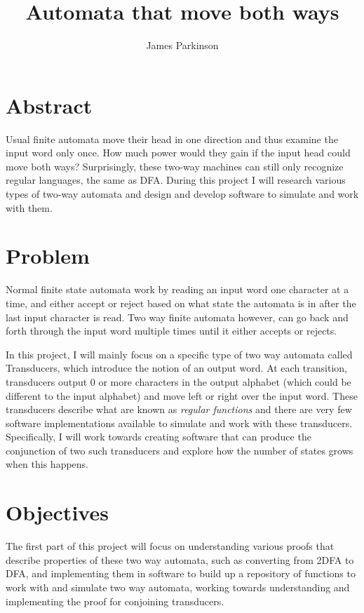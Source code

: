 \documentclass[12pt, a4paper]{article}
\title{Automata that move both ways}
\author{James Parkinson}
\begin{document}
\maketitle

\section{Abstract}

Usual finite automata move their head in one direction and thus examine the input word only once. How much power would they gain if the input head could move both ways? Surprisingly, these two-way machines can still only recognize regular languages, the same as DFA. During this project I will research various types of two-way automata and design and develop software to simulate and work with them.

\section{Problem}

Normal finite state automata work by reading an input word one character at a time, and either accept or reject based on what state the automata is in after the last input character is read. Two way finite automata however, can go back and forth through the input word multiple times until it either accepts or rejects. 

In this project, I will mainly focus on a specific type of two way automata called Transducers, which introduce the notion of an output word. At each transition, transducers output 0 or more characters in the output alphabet (which could be different to the input alphabet) and move left or right over the input word. These transducers describe what are known as \textit{regular functions} and there are very few software implementations available to simulate and work with these transducers. Specifically, I will work towards creating software that can produce the conjunction of two such transducers and explore how the number of states grows when this happens.

\section{Objectives}

The first part of this project will focus on understanding various proofs that describe properties of these two way automata, such as converting from 2DFA to DFA, and implementing them in software to build up a repository of functions to work with and simulate two way automata, working towards understanding and implementing the proof for conjoining transducers.
\end{document}
